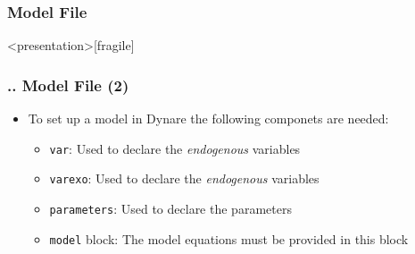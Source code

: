 \documentclass[11pt,aspectratio=169]{beamer}
\begin{document}
\subsubsection{Model File}
\begin{frame}<presentation>[fragile]
	\frametitle{{\thesection.\thesubsection.\thesubsubsection} Model File (2)}
	\begin{itemize}
		\item To set up a model in Dynare the following componets are needed:
		\begin{itemize}
			\item \texttt{var}: Used to declare the \textit{endogenous} variables
			\item \texttt{varexo}: Used to declare the \textit{endogenous} variables
			\item \texttt{parameters}: Used to declare the parameters
			\item \texttt{model} block: The model equations must be provided in this block
		\end{itemize}
	\end{itemize}
\end{frame}
\end{document}
